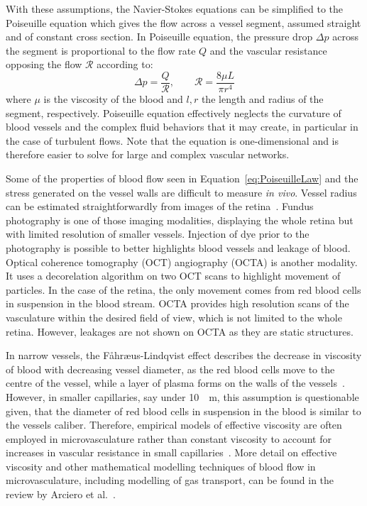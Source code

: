 \documentclass[12pt,a4paper]{journal}
\begin{document}
With these assumptions, the Navier-Stokes equations can be simplified to the Poiseuille equation which gives the flow across a vessel segment, assumed straight and of constant cross section.
In Poiseuille equation, the pressure drop $\Delta p$ across the segment is proportional to the flow rate $Q$ and the vascular resistance opposing the flow $\mathcal{R}$ according to:
\begin{equation}
  \label{eq:PoiseuilleLaw}
  \Delta p = \frac{Q}{\mathcal{R}}, \qquad \mathcal{R} = \frac{8\mu L}{\pi r^4} 
\end{equation}
where $\mu$ is the viscosity of the blood and $l, r$ the length and radius of the segment, respectively.
Poiseuille equation effectively neglects the curvature of blood vessels and the complex fluid behaviors that it may create, in particular in the case of turbulent flows.
Note that the equation is one-dimensional and is therefore easier to solve for large and complex vascular networks.

Some of the properties of blood flow seen in Equation~\ref{eq:PoiseuilleLaw} and the stress generated on the vessel walls are difficult to measure \textit{in vivo}.
Vessel radius can be estimated straightforwardly from images of the retina~\cite{DoblhoffDier2014}.
Fundus photography is one of those imaging modalities, displaying the whole retina but with limited resolution of smaller vessels.
Injection of dye prior to the photography is possible to better highlights blood vessels and leakage of blood.
Optical coherence tomography (OCT) angiography (OCTA) is another modality.
It uses a decorelation algorithm on two OCT scans to highlight movement of particles.
In the case of the retina, the only movement comes from red blood cells in suspension in the blood stream.
OCTA provides high resolution scans of the vasculature within the desired field of view, which is not limited to the whole retina.
However, leakages are not shown on OCTA as they are static structures.

In narrow vessels, the F\r{a}hr\ae us-Lindqvist effect describes the decrease in viscosity of blood with decreasing vessel diameter, as the red blood cells move to the centre of the vessel, while a layer of plasma forms on the walls of the vessels~\cite{F_hr_us_1931}.
However, in smaller capillaries, say under \SI{10}{\mu\meter}, this assumption is questionable given, that the diameter of red blood cells in suspension in the blood is similar to the vessels caliber.
Therefore, empirical models of effective viscosity are often employed in microvasculature rather than constant viscosity to account for increases in vascular resistance in small capillaries~\cite{Pries_1990, Haynes_1960}.
More detail on effective viscosity and other mathematical modelling techniques of blood flow in microvasculature, including modelling of gas transport, can be found in the review by Arciero et al.~\cite{C_Arciero_2017}.
\end{document}
